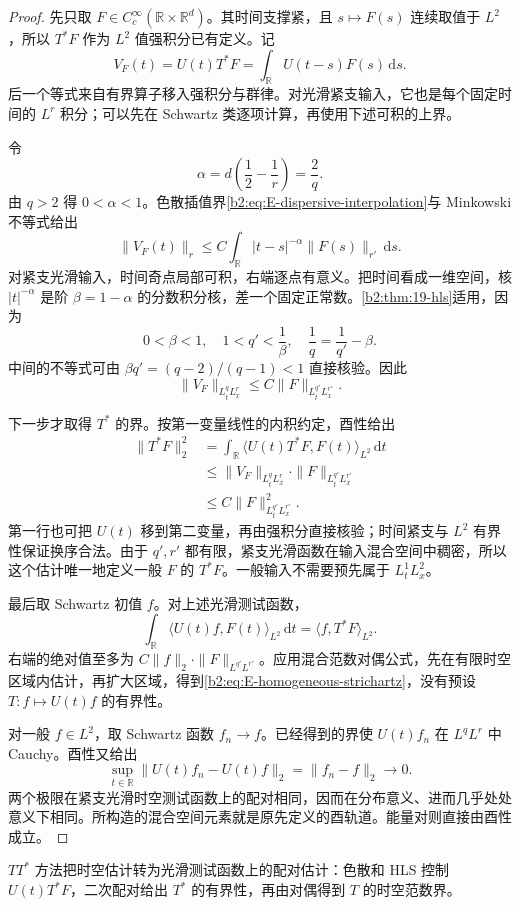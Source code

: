 \begin{proof}
先只取 \(F\in C_c^\infty(\mathbb R\times\mathbb R^d)\)。其时间支撑紧，且 \(s\mapsto F(s)\) 连续取值于 \(L^2\)，所以 \(T^*F\) 作为 \(L^2\) 值强积分已有定义。记
\[
 V_F(t)=U(t)T^*F
       =\int_{\mathbb R}U(t-s)F(s)\,\mathrm ds.
\]
后一个等式来自有界算子移入强积分与群律。对光滑紧支输入，它也是每个固定时间的 \(L^r\) 积分；可以先在 Schwartz 类逐项计算，再使用下述可积的上界。

令
\[
 \alpha=d\left(\frac12-\frac1r\right)=\frac2q.
\]
由 \(q>2\) 得 \(0<\alpha<1\)。色散插值界\eqref{b2:eq:E-dispersive-interpolation}与 Minkowski 不等式给出
\begin{equation}\label{b2:eq:E-ttstar-positive-kernel}
 \|V_F(t)\|_r
 \leq C\int_{\mathbb R}|t-s|^{-\alpha}
                     \|F(s)\|_{r'}\,\mathrm ds.
\end{equation}
对紧支光滑输入，时间奇点局部可积，右端逐点有意义。把时间看成一维空间，核 \(|t|^{-\alpha}\) 是阶 \(\beta=1-\alpha\) 的分数积分核，差一个固定正常数。\cref{b2:thm:19-hls}适用，因为
\[
 0<\beta<1,\quad
 1<q'<\frac1\beta,\quad
 \frac1q=\frac1{q'}-\beta.
\]
中间的不等式可由 \(\beta q'=(q-2)/(q-1)<1\) 直接核验。因此
\begin{equation}\label{b2:eq:E-ttstar-bound}
 \|V_F\|_{L^q_tL^r_x}
 \leq C\|F\|_{L^{q'}_tL^{r'}_x}.
\end{equation}

下一步才取得 \(T^*\) 的界。按第一变量线性的内积约定，酉性给出
\[
 \begin{aligned}
 \|T^*F\|_2^2
 &=\int_{\mathbb R}
      \langle U(t)T^*F,F(t)\rangle_{L^2}\,\mathrm dt\\
 &\leq \|V_F\|_{L^q_tL^r_x}
              \cdot\|F\|_{L^{q'}_tL^{r'}_x}\\
 &\leq C\|F\|_{L^{q'}_tL^{r'}_x}^2.
 \end{aligned}
\]
第一行也可把 \(U(t)\) 移到第二变量，再由强积分直接核验；时间紧支与 \(L^2\) 有界性保证换序合法。由于 \(q',r'\) 都有限，紧支光滑函数在输入混合空间中稠密，所以这个估计唯一地定义一般 \(F\) 的 \(T^*F\)。一般输入不需要预先属于 \(L^1_tL^2_x\)。

最后取 Schwartz 初值 \(f\)。对上述光滑测试函数，
\[
 \int_{\mathbb R}
       \langle U(t)f,F(t)\rangle_{L^2}\,\mathrm dt
 =\langle f,T^*F\rangle_{L^2}.
\]
右端的绝对值至多为
\(C\|f\|_2\cdot\|F\|_{L^{q'}L^{r'}}\)。应用混合范数对偶公式，先在有限时空区域内估计，再扩大区域，得到\eqref{b2:eq:E-homogeneous-strichartz}，没有预设 \(T:f\mapsto U(t)f\) 的有界性。

对一般 \(f\in L^2\)，取 Schwartz 函数 \(f_n\to f\)。已经得到的界使 \(U(t)f_n\) 在 \(L^qL^r\) 中 Cauchy。酉性又给出
\[
 \sup_{t\in\mathbb R}\|U(t)f_n-U(t)f\|_2
 =\|f_n-f\|_2\longrightarrow0.
\]
两个极限在紧支光滑时空测试函数上的配对相同，因而在分布意义、进而几乎处处意义下相同。所构造的混合空间元素就是原先定义的酉轨道。能量对则直接由酉性成立。
\end{proof}
\(TT^*\) 方法把时空估计转为光滑测试函数上的配对估计：色散和 HLS 控制 \(U(t)T^*F\)，二次配对给出 \(T^*\) 的有界性，再由对偶得到 \(T\) 的时空范数界。


